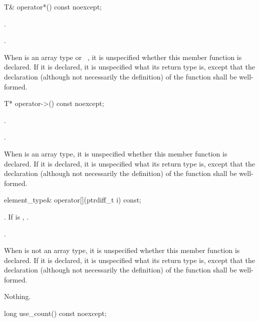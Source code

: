%
\begin{itemdecl}
T& operator*() const noexcept;
\end{itemdecl}

\begin{itemdescr}
\pnum
\expects
{}.

\pnum
\returns
{}.

\pnum
\remarks
When  is an array type or \cv{}~,
it is unspecified whether this
member function is declared. If it is declared, it is unspecified what its
return type is, except that the declaration (although not necessarily the
definition) of the function shall be well-formed.
\end{itemdescr}

%
\begin{itemdecl}
T* operator->() const noexcept;
\end{itemdecl}

\begin{itemdescr}
\pnum
\expects
{}.

\pnum
\returns
{}.

\pnum
\remarks
When  is an array type,
it is unspecified whether this member function is declared.
If it is declared, it is unspecified what its return type is,
except that the declaration (although not necessarily the definition)
of the function shall be well-formed.
\end{itemdescr}

%
\begin{itemdecl}
element_type& operator[](ptrdiff_t i) const;
\end{itemdecl}

\begin{itemdescr}
\pnum
\expects
{}.
If  is , .

\pnum
\returns
{}.

\pnum
\remarks
When  is not an array type,
it is unspecified whether this member function is declared.
If it is declared, it is unspecified what its return type is,
except that the declaration (although not necessarily the definition)
of the function shall be well-formed.

\pnum
\throws
Nothing.
\end{itemdescr}

\begin{indexed}{}
\begin{itemdecl}
long use_count() const noexcept;
\end{itemdecl}
\end{indexed}

